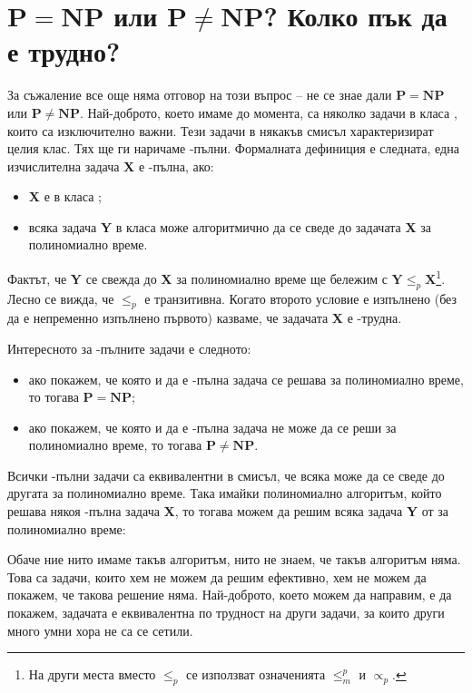 \section{$\mathbf{P = NP}$ или $\mathbf{P \neq NP}$? Колко пък да е трудно?}

За съжаление все още няма отговор на този въпрос -- не се знае дали $\mathbf{P = NP}$  или $\mathbf{P \neq NP}$.
Най-доброто, което имаме до момента, са няколко задачи в класа \NP, които са изключително важни.
Тези задачи в някакъв смисъл характеризират целия клас.
Тях ще ги наричаме \NP-пълни.
Формалната дефиниция е следната, една изчислителна задача \textbf{X} е \NP-пълна, ако:
\begin{itemize}
    \item \textbf{X} е в класа \NP;
    \item всяка задача \textbf{Y} в класа \NP{ }може алгоритмично да се сведе до задачата \textbf{X} за полиномиално време.
\end{itemize}
Фактът, че \textbf{Y} се свежда до \textbf{X} за полиномиално време ще бележим с $\mathbf{Y} \leq_p \mathbf{X}$\footnote{На други места вместо $\leq_p$ се използват означенията $\leq^p_m$ и $\propto_p$.}.
Лесно се вижда, че $\leq_p$ е транзитивна.
Когато второто условие е изпълнено (без да е непременно изпълнено първото) казваме, че задачата \textbf{X} е \NP-трудна.

Интересното за \NP-пълните задачи е следното:
\begin{itemize}
    \item ако покажем, че която и да е \NP-пълна задача се решава за полиномиално време, то тогава $\mathbf{P = NP}$;
    \item ако покажем, че която и да е \NP-пълна задача не може да се реши за полиномиално време, то тогава $\mathbf{P \neq NP}$.
\end{itemize}
Всички \NP-пълни задачи са еквивалентни в смисъл, че всяка може да се сведе до другата за полиномиално време.
Така имайки полиномиално алгоритъм, който решава някоя \NP-пълна задача \textbf{X}, то тогава можем да решим всяка задача \textbf{Y} от \NP{} за полиномиално време:

Обаче ние нито имаме такъв алгоритъм, нито не знаем, че такъв алгоритъм няма.
Това са задачи, които хем не можем да решим ефективно, хем не можем да покажем, че такова решение няма.
Най-доброто, което можем да направим, е да покажем, задачата е еквивалентна по трудност на други задачи, за които други много умни хора не са се сетили.

